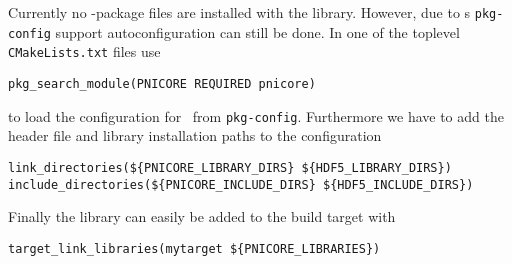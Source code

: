 Currently no \cmake-package files are installed with the library. However, due
to \cmake s {\tt pkg-config} support autoconfiguration can still be done. In one
of the toplevel {\tt CMakeLists.txt} files use
\begin{verbatim}
pkg_search_module(PNICORE REQUIRED pnicore)
\end{verbatim}
to load the configuration for \libpnicore\ from {\tt pkg-config}. Furthermore we
have to add the header file and library installation paths to the configuration
\begin{verbatim}
link_directories(${PNICORE_LIBRARY_DIRS} ${HDF5_LIBRARY_DIRS})
include_directories(${PNICORE_INCLUDE_DIRS} ${HDF5_INCLUDE_DIRS})
\end{verbatim}
Finally the library can easily be added to the build target with 
\begin{verbatim}
target_link_libraries(mytarget ${PNICORE_LIBRARIES})
\end{verbatim}


